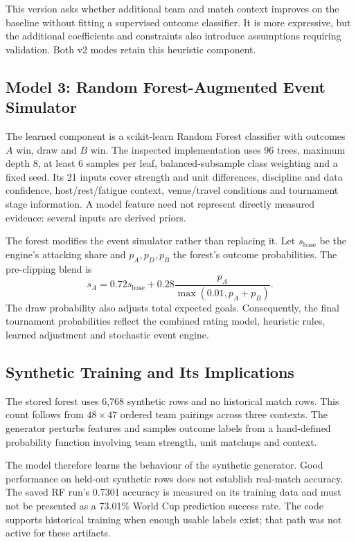 This version asks whether additional team and match context improves on the
baseline without fitting a supervised outcome classifier. It is more expressive,
but the additional coefficients and constraints also introduce assumptions
requiring validation. Both v2 modes retain this heuristic component.
\subsection{Model 3: Random Forest-Augmented Event Simulator}
The learned component is a scikit-learn Random Forest classifier with outcomes
$A$ win, draw and $B$ win. The inspected implementation uses 96 trees, maximum
depth 8, at least 6 samples per leaf, balanced-subsample class weighting and a
fixed seed. Its 21 inputs cover strength and unit differences, discipline and
data confidence, host/rest/fatigue context, venue/travel conditions and tournament
stage information. A model feature need not represent directly measured evidence:
several inputs are derived priors.

The forest modifies the event simulator rather than replacing it. Let
$s_{\mathrm{base}}$ be the engine's attacking share and $p_A,p_D,p_B$ the forest's
outcome probabilities. The pre-clipping blend is
\begin{equation}
s_A=0.72s_{\mathrm{base}}+
0.28\frac{p_A}{\max(0.01,p_A+p_B)}.
\end{equation}
The draw probability also adjusts total expected goals. Consequently, the final
tournament probabilities reflect the combined rating model, heuristic rules,
learned adjustment and stochastic event engine.
\subsection{Synthetic Training and Its Implications}
The stored forest uses 6,768 synthetic rows and no historical match rows. This
count follows from $48\times47$ ordered team pairings across three contexts.
The generator perturbs features and samples outcome labels from a hand-defined
probability function involving team strength, unit matchups and context.

The model therefore learns the behaviour of the synthetic generator. Good
performance on held-out synthetic rows does not establish real-match accuracy.
The saved RF run's 0.7301 accuracy is measured on its training data and must not
be presented as a 73.01\% World Cup prediction success rate. The code supports
historical training when enough usable labels exist; that path was not active
for these artifacts.
\clearpage
